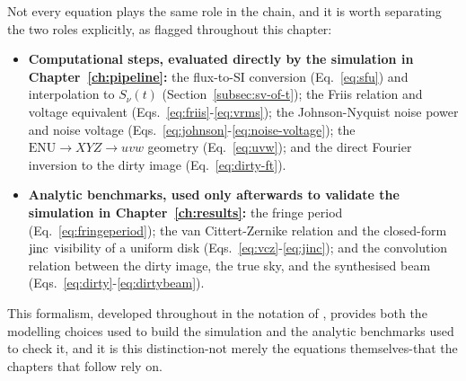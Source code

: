 Not every equation plays the same role in the chain, and it is worth
separating the two roles explicitly, as flagged throughout this chapter:
\begin{itemize}[leftmargin=1.5em]
  \item \textbf{Computational steps, evaluated directly by the simulation in
        Chapter~\ref{ch:pipeline}:} the flux-to-SI conversion
        (Eq.~\eqref{eq:sfu}) and interpolation to $S_\nu(t)$
        (Section~\ref{subsec:sv-of-t}); the Friis relation and voltage
        equivalent (Eqs.~\eqref{eq:friis}-\eqref{eq:vrms}); the Johnson-Nyquist
        noise power and noise voltage (Eqs.~\eqref{eq:johnson}-\eqref{eq:noise-voltage});
        the $\mathrm{ENU}\to XYZ\to uvw$ geometry (Eq.~\eqref{eq:uvw}); and
        the direct Fourier inversion to the dirty image
        (Eq.~\eqref{eq:dirty-ft}).
  \item \textbf{Analytic benchmarks, used only afterwards to validate the
        simulation in Chapter~\ref{ch:results}:} the fringe period
        (Eq.~\eqref{eq:fringeperiod}); the van Cittert-Zernike relation and the
        closed-form $\operatorname{jinc}$ visibility of a uniform disk
        (Eqs.~\eqref{eq:vcz}-\eqref{eq:jinc}); and the convolution relation
        between the dirty image, the true sky, and the synthesised beam
        (Eqs.~\eqref{eq:dirty}-\eqref{eq:dirtybeam}).
\end{itemize}
This formalism, developed throughout in the notation of
\citet{taylor1999synthesis}, provides both the modelling choices used to build
the simulation and the analytic benchmarks used to check it, and it is this
distinction-not merely the equations themselves-that the chapters that follow
rely on.
